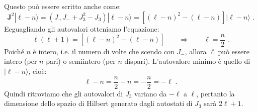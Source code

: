 \documentclass[12pt,a4paper]{report}
\theoremstyle{definition}
\numberwithin{equation}{section}
\newcommand{\ket}{\rangle}
\begin{document}
Questo può essere scritto anche come:
\begin{equation}
\mathbf{J}^2|\ell-n\ket=(J_+J_-+J_3^2-J_3)|\ell-n\ket=[(\ell-n)^2-(\ell-n)]|\ell-n\ket\;.
\end{equation}
Eeguagliando gli autovalori otteniamo l'equazione:
\begin{equation}
\ell(\ell+1)=[(\ell-n)^2-(\ell-n)] \qquad \Longrightarrow \qquad \ell=\frac{n}{2}\;.
\end{equation}
Poiché $n$ è intero, i.e. il numero di volte che scendo con $J_-$, allora $\ell$ può essere intero (per $n$ pari) o semiintero (per $n$ dispari). L'autovalore minimo è quello di $|\ell-n\ket$, cioè:
\begin{equation}
\ell-n=\frac{n}{2}-n=-\frac{n}{2}=-\ell\;.
\end{equation}
Quindi ritroviamo che gli autovalori di $J_3$ variano da $-\ell$ a $\ell$, pertanto la dimensione dello spazio di Hilbert generato dagli autostati di $J_3$ sarà $2\ell+1$.
\end{document}
